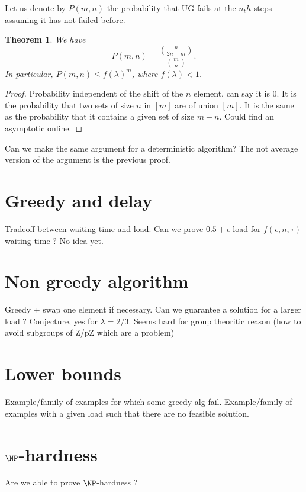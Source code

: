 \documentclass[10pt, conference, letterpaper]{IEEEtran}
\newtheorem{theorem}{Theorem}
\begin{document}
Let us denote by $P(m,n)$ the probability that UG fails at the $n_th$
steps assuming it has not failed before.

\begin{theorem}
We have $$P(m,n) = \frac{\binom{n}{2n-m}}{\binom{m}{n}}.$$
In particular, $P(m,n) \leq f(\lambda)^m$, where $f(\lambda) < 1$.
\end{theorem}
\begin{proof}
Probability independent of the shift of the $n$ element, can say it is $0$.
It is the probability that two sets of size $n$ in $[m]$ are of union $[m]$.
It is the same as the probability that it contains a given set of size $m-n$.
Could find an asymptotic online.
\end{proof}

Can we make the same argument for a deterministic algorithm?
The not average version of the argument is the previous proof.

\section{Greedy and delay}

Tradeoff between waiting time and load. Can we prove $0.5 + \epsilon$ load for $f(\epsilon,n,\tau)$ waiting time ?  No idea yet.


\section{Non greedy algorithm}

Greedy + swap one element if necessary. 
Can we guarantee a solution for a larger load ? Conjecture, yes for $\lambda = 2/3$. 
Seems hard for group theoritic reason (how to avoid subgroups of Z/pZ which are a problem)

\section{Lower bounds}

Example/family of examples for which some greedy alg fail.
Example/family of examples with a given load such that there are no feasible solution.

\section{$\NP$-hardness}

Are we able to prove $\NP$-hardness ?

% 
% 
\end{document}
